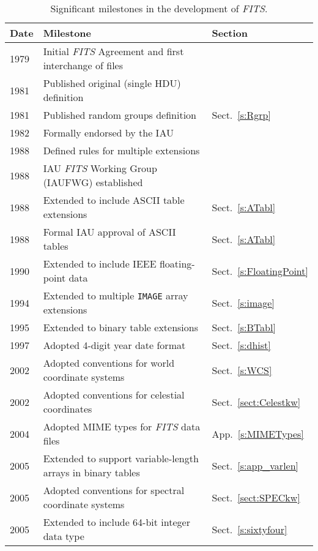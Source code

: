 \documentclass[onecolumn]{aa}
\begin{document}
\begin{table*}
\centering
\caption{Significant milestones in the development of {\em FITS}.}
\label{t:hist}
\begin{tabular}{lll} 
\hline \hline
Date & Milestone & Section\\
\hline
      1979 & Initial {\em FITS\/} Agreement and first interchange of files & \\
      1981 & Published original (single HDU) definition \citep{wells81}  & \\
      1981 & Published random groups definition \citep{greisen81} & Sect.\ \ref{s:Rgrp} \\
      1982 & Formally endorsed by the IAU \citep{iau83} & \\
      1988 & Defined rules for multiple extensions \citep{grosbol88} & \\
      1988 & IAU {\em FITS\/} Working Group (IAUFWG) established & \\
      1988 & Extended to include ASCII table extensions \citep{harten88} & Sect.\ \ref{s:ATabl} \\
      1988 & Formal IAU approval of ASCII tables \citep{iau88} & Sect.\ \ref{s:ATabl} \\
      1990 & Extended to include IEEE floating-point data \citep{wells90} & Sect.\ \ref{s:FloatingPoint} \\
      1994 & Extended to multiple {\tt IMAGE} array extensions \citep{ponz94} & Sect.\ \ref{s:image} \\
      1995 & Extended to binary table extensions \citep{cotton95} & Sect.\ \ref{s:BTabl} \\
      1997 & Adopted 4-digit year date format \citep{bunclark97}  & Sect.\ \ref{s:dhist} \\
      2002 & Adopted conventions for world coordinate systems \citep{greisen02} & Sect.\ \ref{s:WCS} \\
      2002 & Adopted conventions for celestial coordinates \citep{calabretta02} & Sect.\ \ref{sect:Celestkw} \\
      2004 & Adopted MIME types for {\em FITS\/} data files \citep{rfc4047} & App.\ \ref{s:MIMETypes} \\
      2005 & Extended to support variable-length arrays in binary tables & Sect.\ \ref{s:app_varlen} \\
      2005 & Adopted conventions for spectral coordinate systems \citep{greisen06} & Sect.\ \ref{sect:SPECkw} \\
      2005 & Extended to include 64-bit integer data type & Sect.\ \ref{s:sixtyfour} \\ 
\hline
\end{tabular}
\end{table*}
\end{document}
